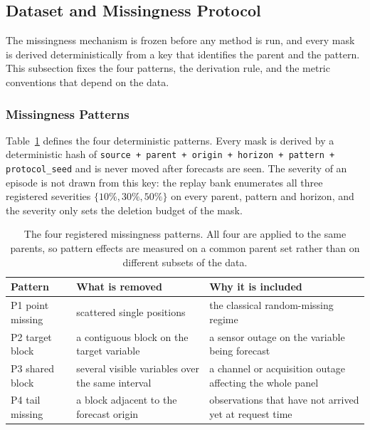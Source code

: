 \documentclass{article}
\begin{document}
\subsection{Dataset and Missingness Protocol}
\label{app:data-protocol}
The missingness mechanism is frozen before any method is run, and every mask is derived
deterministically from a key that identifies the parent and the pattern. This subsection fixes
the four patterns, the derivation rule, and the metric conventions that depend on the data.

\subsubsection{Missingness Patterns}
\label{app:patterns}
Table~\ref{tab:app-patterns} defines the four deterministic patterns. Every mask is derived
by a deterministic hash of
\texttt{source + parent + origin + horizon + pattern + protocol\_seed} and is never moved
after forecasts are seen. The severity of an episode is not drawn from this key: the replay
bank enumerates all three registered severities $\{10\%, 30\%, 50\%\}$ on every parent,
pattern and horizon, and the severity only sets the deletion budget of the mask.

\begin{table}[htbp]
  \caption{The four registered missingness patterns. All four are applied to the same parents,
  so pattern effects are measured on a common parent set rather than on different subsets of
  the data.}
  \label{tab:app-patterns}
  \centering
  \small
  \setlength{\tabcolsep}{4pt}
\begin{tabular}{@{}l p{} p{}@{}}
    \toprule
    Pattern & What is removed & Why it is included \\
    \midrule
    P1 point missing    & scattered single positions & the classical random-missing regime \\
    P2 target block     & a contiguous block on the target variable & a sensor outage on the variable being forecast \\
    P3 shared block     & several visible variables over the same interval & a channel or acquisition outage affecting the whole panel \\
    P4 tail missing     & a block adjacent to the forecast origin & observations that have not arrived yet at request time \\
    \bottomrule
  \end{tabular}
\end{table}
\end{document}
